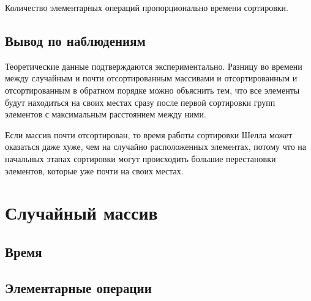 \documentclass[11pt]{article}
\begin{document}
Количество элементарных операций пропорционально времени сортировки.

\subsection{Вывод по наблюдениям}

Теоретические данные подтверждаются экспериментально. Разницу во времени между случайным и почти отсортированным
массивами и отсортированным и отсортированным в обратном порядке можно объяснить тем, что все элементы будут находиться на своих
местах сразу после первой сортировки групп элементов с максимальным расстоянием между ними.

Если массив почти отсортирован, то время работы сортировки Шелла может оказаться даже хуже, чем на случайно расположенных элементах, потому что на начальных
этапах сортировки могут происходить большие перестановки элементов, которые уже почти на своих местах.

\newpage

\setcounter{section}{14}
\section*{\centering Случайный массив}

\setcounter{subsection}{0}
\subsection{Время}

\begin{center}
\end{center}
{ \hspace*{\fill} }

\begin{center}
\end{center}
{ \hspace*{\fill} }

\subsection{Элементарные операции}

\begin{center}
\end{center}
{ \hspace*{\fill} }
\end{document}
